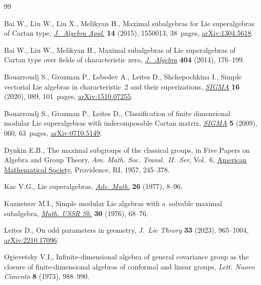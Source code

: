 \begin{thebibliography}{99}
\footnotesize\itemsep=0pt

Bai W., Liu W., Liu X., Melikyan H., Maximal subalgebras for {L}ie
 superalgebras of {C}artan type,
 \href{https://doi.org/10.1142/S0219498815500139}{\textit{J.~Algebra Appl.}}
 \textbf{14} (2015), 1550013, 38~pages,
 \href{http://arxiv.org/abs/1304.5618}{arXiv:1304.5618}.

Bai W., Liu W., Melikyan H., Maximal subalgebras of {L}ie superalgebras of
 {C}artan type over fields of characteristic zero,
 \href{https://doi.org/10.1016/j.jalgebra.2013.12.033}{\textit{J.~Algebra}}
 \textbf{404} (2014), 176--199.

Bouarroudj S., Grozman P., Lebedev A., Leites D., Shchepochkina I., Simple
 vectorial {L}ie algebras in characteristic~2 and their superizations,
 \href{https://doi.org/10.3842/SIGMA.2020.089}{\textit{SIGMA}} \textbf{16}
 (2020), 089, 101~pages,
 \href{http://arxiv.org/abs/1510.07255}{arXiv:1510.07255}.

Bouarroudj S., Grozman P., Leites D., Classification of finite dimensional
 modular {L}ie superalgebras with indecomposable {C}artan matrix,
 \href{https://doi.org/10.3842/SIGMA.2009.060}{\textit{SIGMA}} \textbf{5}
 (2009), 060, 63~pages,
 \href{http://arxiv.org/abs/0710.5149}{arXiv:0710.5149}.

Dynkin E.B., The maximal subgroups of the classical groups, in Five Papers on
 Algebra and Group Theory, \textit{Am. Math. Soc. Transl.~II.~Ser}, Vol.~6,
 \href{https://doi.org/10.1090/trans2/006}{American Mathematical Society},
 Providence, RI, 1957, 245--378.

Kac V.G., Lie superalgebras,
 \href{https://doi.org/10.1016/0001-8708(77)90017-2}{\textit{Adv. Math.}}
 \textbf{26} (1977), 8--96.

Kuznetsov M.I., Simple modular {L}ie algebras with a~solvable maximal
 subalgebra,
 \href{https://doi.org/10.1070/SM1976v030n01ABEH001899}{\textit{Math. USSR
 Sb.}} \textbf{30} (1976), 68--76.

Leites D., On odd parameters in geometry, \textit{J.~Lie Theory} \textbf{33}
 (2023), 965--1004, \href{http://arxiv.org/abs/2210.17096}{arXiv:2210.17096}.

Ogievetsky V.I., Infinite-dimensional algebra of general covariance group as
 the closure of finite-dimensional algebras of conformal and linear groups,
 \textit{Lett. Nuovo Cimento} \textbf{8} (1973), 988--990.


\end{thebibliography}
